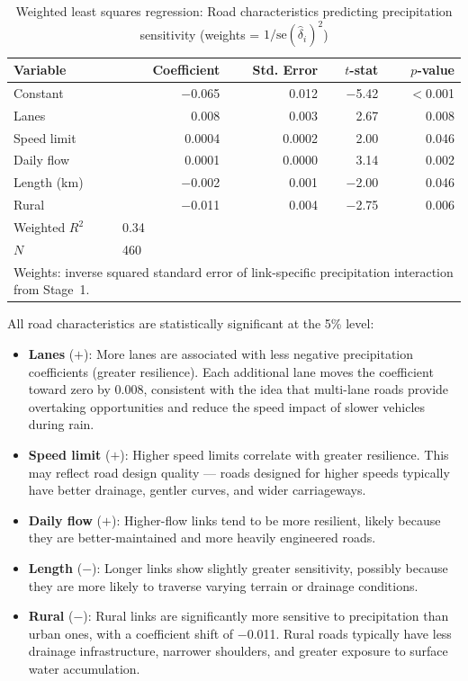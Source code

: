 \documentclass[review]{elsarticle}
\begin{document}
\begin{table}[htbp]
\centering
\caption{Weighted least squares regression: Road characteristics predicting precipitation sensitivity (weights = $1/\text{se}(\hat{\delta}_i)^2$)}
\label{tab:wls}
\begin{tabular}{lrrrr}
\toprule
Variable & Coefficient & Std. Error & $t$-stat & $p$-value \\
\midrule
Constant & $-$0.065 & 0.012 & $-$5.42 & $<$0.001 \\
Lanes & 0.008 & 0.003 & 2.67 & 0.008 \\
Speed limit & 0.0004 & 0.0002 & 2.00 & 0.046 \\
Daily flow & 0.0001 & 0.0000 & 3.14 & 0.002 \\
Length (km) & $-$0.002 & 0.001 & $-$2.00 & 0.046 \\
Rural & $-$0.011 & 0.004 & $-$2.75 & 0.006 \\
\midrule
Weighted $R^2$ & \multicolumn{4}{l}{0.34} \\
$N$ & \multicolumn{4}{l}{460} \\
\bottomrule
\multicolumn{5}{l}{\footnotesize Weights: inverse squared standard error of link-specific precipitation interaction from Stage~1.} \\
\end{tabular}
\end{table}

All road characteristics are statistically significant at the 5\% level:

\begin{itemize}
    \item \textbf{Lanes} ($+$): More lanes are associated with less negative precipitation coefficients (greater resilience). Each additional lane moves the coefficient toward zero by 0.008, consistent with the idea that multi-lane roads provide overtaking opportunities and reduce the speed impact of slower vehicles during rain.
    \item \textbf{Speed limit} ($+$): Higher speed limits correlate with greater resilience. This may reflect road design quality --- roads designed for higher speeds typically have better drainage, gentler curves, and wider carriageways.
    \item \textbf{Daily flow} ($+$): Higher-flow links tend to be more resilient, likely because they are better-maintained and more heavily engineered roads.
    \item \textbf{Length} ($-$): Longer links show slightly greater sensitivity, possibly because they are more likely to traverse varying terrain or drainage conditions.
    \item \textbf{Rural} ($-$): Rural links are significantly more sensitive to precipitation than urban ones, with a coefficient shift of $-$0.011. Rural roads typically have less drainage infrastructure, narrower shoulders, and greater exposure to surface water accumulation.
\end{itemize}
\end{document}
